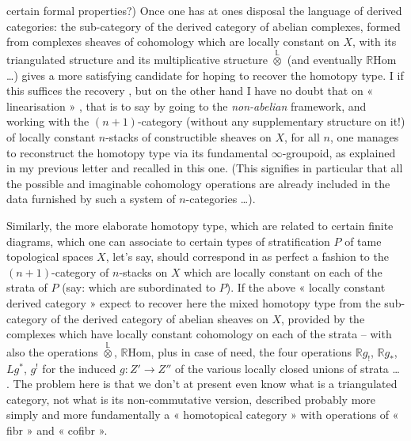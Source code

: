 \documentclass[11pt,a4paper]{article}
\begin{document}
certain formal properties?) Once one has at ones disposal the language of derived categories: the sub-category of the derived category of abelian complexes, formed from complexes   sheaves of cohomology  which are locally constant on $X$, with its triangulated structure and its multiplicative structure $\overset{\mathbb{L}}{\otimes}$ (and eventually $\mathbb{R}\mathrm{Hom}$ …) gives a more satisfying candidate for hoping to recover the homotopy type. I   if this suffices  the recovery   , but on the other hand I have no doubt that on   « linearisation » , that is to say by going to the \emph{non-abelian} framework, and working with the $(n+1)$-category (without any supplementary structure on it!) of locally constant $n$-stacks of constructible sheaves on $X$, for all $n$, one manages to reconstruct the homotopy type via its fundamental $\infty$-groupoid, as explained in my previous letter and recalled in this one. (This signifies in particular that all the possible and imaginable cohomology operations are already included in the data furnished by such a system of $n$-categories …).

Similarly, the more elaborate homotopy type, which are related to certain finite diagrams, which one can associate to certain types of stratification $P$ of tame topological spaces $X$, let's say, should correspond in as perfect a fashion to the $(n+1)$-category of $n$-stacks on $X$ which are locally constant on each of the strata of $P$ (say: which are subordinated to $P$). If the above   « locally constant derived category »    expect to recover here the mixed homotopy type from the  sub-category of the derived category of abelian sheaves on $X$, provided by the complexes which have locally constant cohomology on each of the strata -- with also the operations $\overset{\mathbb{L}}{\otimes}$, $\mathbb{R}\mathrm{Hom}$, plus in case of need, the four operations $\mathbb{R}g_!$, $\mathbb{R}g_*$, $Lg^*$, $g^!$ for the induced $g : Z' \to Z''$ of the various locally closed unions of strata … . The problem here is that we don't at present even know what is a triangulated category, not   what is its non-commutative version, described probably more simply and more fundamentally\add{:}  a « homotopical category » with operations of  « fibr » and « cofibr ».
\end{document}
